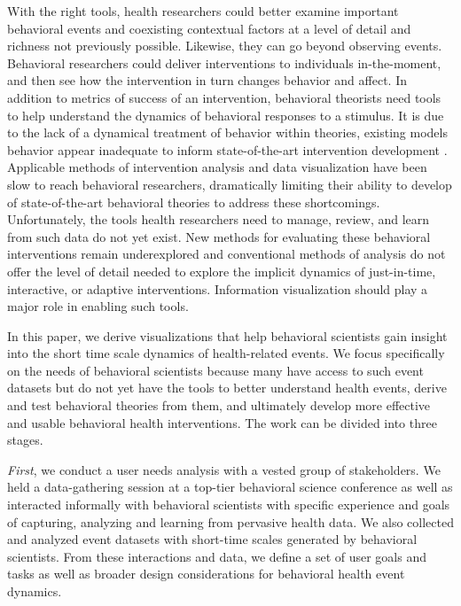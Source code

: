 With the right tools, health researchers could better examine important behavioral events and coexisting contextual factors at a level of detail and richness not previously possible. 
Likewise, they can go beyond observing events.
Behavioral researchers could deliver interventions to individuals in-the-moment, and then see how the intervention in turn changes behavior and affect.
In addition to metrics of success of an intervention, behavioral theorists need tools to help understand the dynamics of behavioral responses to a stimulus.
It is due to the lack of a dynamical treatment of behavior within theories, existing models behavior appear inadequate to inform state-of-the-art intervention development \cite{riley2011}.
Applicable methods of intervention analysis and data visualization have been slow to reach behavioral researchers, dramatically limiting their ability to develop of state-of-the-art behavioral theories to address these shortcomings.
Unfortunately, the tools health researchers need to manage, review, and learn from such data do not yet exist. 
New methods for evaluating these behavioral interventions remain underexplored and conventional methods of analysis do not offer the level of detail needed to explore the implicit dynamics of just-in-time, interactive, or adaptive interventions.
Information visualization should play a major role in enabling such tools.


In this paper, we derive visualizations that help behavioral scientists gain insight into the short time scale dynamics of health-related events. We focus specifically on the needs of behavioral scientists because many have access to such event datasets but do not yet have the tools to better understand health events, derive and test behavioral theories from them, and ultimately develop more effective and usable behavioral health interventions. The work can be divided into three stages.

\textit{First}, we conduct a user needs analysis with a vested group of stakeholders. We held a data-gathering session at a top-tier behavioral science conference as well as interacted informally with behavioral scientists with specific experience and goals of capturing, analyzing and learning from pervasive health data. We also collected  and analyzed event datasets with short-time scales generated by behavioral scientists. From these interactions and data, we define a set of user goals and tasks as well as broader design considerations for behavioral health event dynamics.

